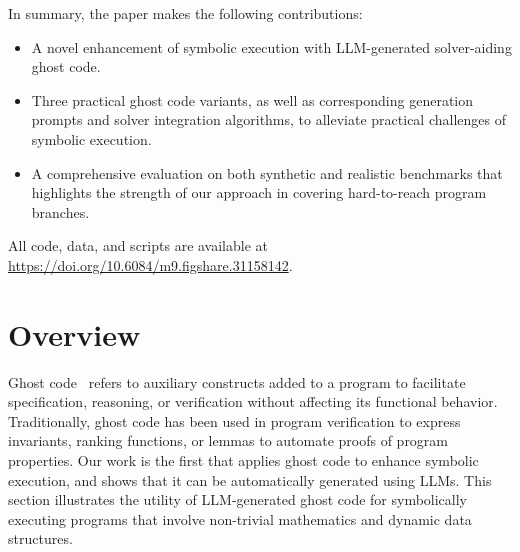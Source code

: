 \documentclass[acmsmall]{acmart}
\theoremstyle{definition}
\begin{document}
In summary, the paper makes the following contributions:

\begin{itemize}
\item A novel enhancement of symbolic execution with LLM-generated solver-aiding ghost code.
\item Three practical ghost code variants, as well as corresponding generation prompts and solver integration algorithms, to alleviate practical challenges of symbolic execution.
\item A comprehensive evaluation on both synthetic and realistic benchmarks that highlights the strength of our approach in covering hard-to-reach program branches.
\end{itemize}

All code, data, and scripts are available at \url{https://doi.org/10.6084/m9.figshare.31158142}.

\section{Overview}

Ghost code~\cite{filliatre2016spirit} refers to auxiliary constructs added to a program to facilitate specification, reasoning, or verification without affecting its functional behavior. Traditionally, ghost code has been used in program verification to express invariants, ranking functions, or lemmas to automate proofs of program properties. Our work is the first that applies ghost code to enhance symbolic execution, and shows that it can be automatically generated using LLMs. This section illustrates the utility of LLM-generated ghost code for symbolically executing programs that involve non-trivial mathematics and dynamic data structures.
\end{document}
